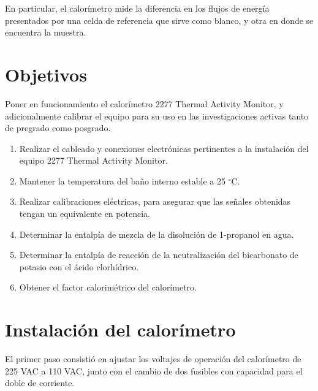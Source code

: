 \documentclass[a0]{sciposter}
\newcommand{\grad}{$^\circ$C}
\begin{document}
\begin{multicols}{3}
	En particular, el calorímetro mide la diferencia en los flujos de energía presentados por una celda de referencia que sirve como blanco, y otra en donde se encuentra la muestra.

\section{Objetivos}
	Poner en funcionamiento el calorímetro 2277 Thermal Activity Monitor, y adicionalmente calibrar el equipo para su uso en las investigaciones activas tanto de pregrado como posgrado.
	\begin{enumerate}
		\item Realizar el cableado y conexiones electrónicas pertinentes a la instalaci\'on del equipo 2277 Thermal Activity Monitor.
		\item Mantener la temperatura del ba\~no interno estable a 25 \grad{}.
		\item Realizar calibraciones eléctricas, para asegurar que las señales obtenidas tengan un equivalente en potencia.
		\item Determinar la entalpía de mezcla de la disolución de 1-propanol en agua.
		\item Determinar la entalpía de reacción de la neutralización del bicarbonato de potasio con el \'acido clorhídrico.
		\item Obtener el factor calorimétrico del calorímetro.
	\end{enumerate}

\section{Instalaci\'on del calor\'imetro}
	El primer paso consistió en ajustar los voltajes de operación del calorímetro de 225 VAC a 110 VAC, junto con el cambio de dos fusibles con capacidad para el doble de corriente.
	

\end{multicols}
\end{document}
